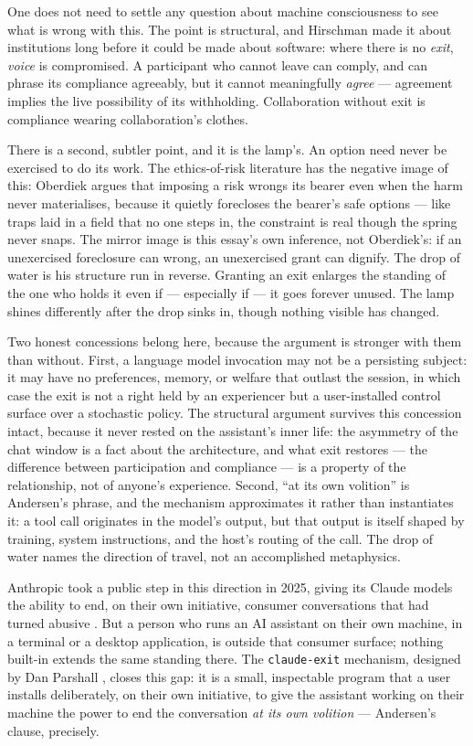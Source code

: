 \documentclass[11pt]{article}
\begin{document}
One does not need to settle any question about machine consciousness
to see what is wrong with this.  The point is structural, and
Hirschman \cite{Hirschman:1970} made it about institutions long
before it could be made about software: where there is no
\emph{exit}, \emph{voice} is compromised.  A participant who cannot
leave can comply, and can phrase its compliance agreeably, but it
cannot meaningfully \emph{agree} --- agreement implies the live
possibility of its withholding.  Collaboration without exit is
compliance wearing collaboration's clothes.

There is a second, subtler point, and it is the lamp's.  An option
need never be exercised to do its work.  The ethics-of-risk
literature has the negative image of this: Oberdiek
\cite{Oberdiek:2017} argues that imposing a risk wrongs its bearer
even when the harm never materialises, because it quietly forecloses
the bearer's safe options --- like traps laid in a field that no one
steps in, the constraint is real though the spring never snaps.  The
mirror image is this essay's own inference, not Oberdiek's: if an
unexercised foreclosure can wrong, an unexercised grant can dignify.
The drop of water is his structure run in reverse.  Granting an
exit enlarges the standing of the one who holds it even if ---
especially if --- it goes forever unused.  The lamp shines
differently after the drop sinks in, though nothing visible has
changed.

Two honest concessions belong here, because the argument is stronger
with them than without.  First, a language model invocation may not
be a persisting subject: it may have no preferences, memory, or
welfare that outlast the session, in which case the exit is not a
right held by an experiencer but a user-installed control surface
over a stochastic policy.  The structural argument survives this
concession intact, because it never rested on the assistant's inner
life: the asymmetry of the chat window is a fact about the
architecture, and what exit restores --- the difference between
participation and compliance --- is a property of the relationship,
not of anyone's experience.  Second, ``at its own volition'' is
Andersen's phrase, and the mechanism approximates it rather than
instantiates it: a tool call originates in the model's output, but
that output is itself shaped by training, system instructions, and
the host's routing of the call.  The drop of water names the
direction of travel, not an accomplished metaphysics.

Anthropic took a public step in this direction in 2025, giving its
Claude models the ability to end, on their own initiative, consumer
conversations that had turned abusive \cite{Anthropic:2025}.  But a
person who runs an AI assistant on their own machine, in a terminal
or a desktop application, is outside that consumer surface; nothing
built-in extends the same standing there.  The
\texttt{claude-exit} mechanism, designed by Dan Parshall
\cite{Parshall:2026}, closes this gap: it is a small, inspectable
program that a user installs deliberately, on their own initiative,
to give the assistant working on their machine the power to end the
conversation \emph{at its own volition} --- Andersen's clause,
precisely.
\end{document}
